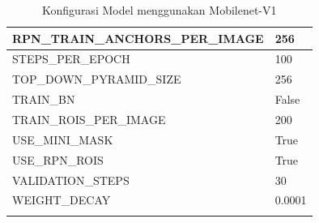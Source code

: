 \begin{longtable}[h]{|l|l|}
	RPN\_TRAIN\_ANCHORS\_PER\_IMAGE & 256                                                                                                                                                                                    \\ \hline
	STEPS\_PER\_EPOCH               & 100                                                                                                                                                                                    \\ \hline
	TOP\_DOWN\_PYRAMID\_SIZE        & 256                                                                                                                                                                                    \\ \hline
	TRAIN\_BN                       & False                                                                                                                                                                                  \\ \hline
	TRAIN\_ROIS\_PER\_IMAGE         & 200                                                                                                                                                                                    \\ \hline
	USE\_MINI\_MASK                 & True                                                                                                                                                                                   \\ \hline
	USE\_RPN\_ROIS                  & True                                                                                                                                                                                   \\ \hline
	VALIDATION\_STEPS               & 30                                                                                                                                                                                     \\ \hline
	WEIGHT\_DECAY                   & 0.0001  
	\\ \hline 
	\caption{Konfigurasi Model menggunakan Mobilenet-V1 }
	\label{tab:conf-mobilenet-v1}
\end{longtable}

\newpage

